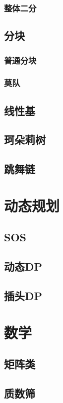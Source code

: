 \documentclass[twocolumn,a4]{article}
\newcommand{\addcpp}[1]{}
\begin{document}
		\subsubsection{整体二分}
	\subsection{分块}
		\subsubsection{普通分块}
		\subsubsection{莫队}
	\subsection{线性基}
	\subsection{珂朵莉树}
	\subsection{跳舞链}

\section{动态规划}
	\subsection{SOS}
		\addcpp{dp/SOS}
	\subsection{动态DP}
	\subsection{插头DP}

\section{数学}
	\subsection{矩阵类}
	\subsection{质数筛}
\end{document}
